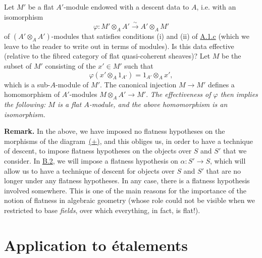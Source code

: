 \documentclass{article}
\newenvironment{rmenv}[1]
  {\phantomsection\par\medskip\noindent\textbf{#1.}\rmfamily}
  {\par\medskip}
\newcommand{\oldpage}[1]{\marginpar{\footnotesize$\Big\vert$ \textit{p.~#1}}}
\begin{document}
Let $M'$ be a flat $A'$-module endowed with a descent data to $A$, i.e. with an isomorphism
\[
  \varphi\colon M'\otimes_A A' \xrightarrow{\sim} A'\otimes_A M'
\]
of $(A'\otimes_A A')$-modules that satisfies conditions (i) and (ii) of \hyperref[A.1.c]{A.1.c} (which we leave to the reader to write out in terms of modules).
Is this data effective (relative to the fibred category of flat quasi-coherent sheaves)?
Let $M$ be the subset of $M'$ consisting of the $x'\in M'$ such that
\[
  \varphi(x'\otimes_A 1_{A'}) = 1_{A'}\otimes_A x',
\]
which is a sub-$A$-module of $M'$.
The canonical injection $M\to M'$ defines a homomorphism of $A'$-modules $M\otimes_A A'\to M'$.
\emph{The effectiveness of $\varphi$ then implies the following: $M$ is a flat $A$-module, and the above homomorphism is an isomorphism.}

\begin{rmenv}{Remark}
  In the above, we have imposed no flatness hypotheses on the morphisms of the diagram~\hyperref[equation-example:A.2.b]{(+)}, and this obliges us, in order to have a technique of descent, to impose flatness hypotheses on the objects over $S$ and $S'$ that we consider.
  In \hyperref[B.2]{B.2}, we will impose a flatness hypothesis on $\alpha\colon S'\to S$, which will allow us to have a technique of descent for objects over $S$ and $S'$ that are no longer under any flatness hypotheses.
  In any case, there is a flatness hypothesis involved somewhere.
  This is one of the main reasons for the importance of the notion of flatness in algebraic geometry (whose role could not be visible when we restricted to base \emph{fields}, over which everything, in fact, is flat!).
\end{rmenv}


\oldpage{190-10}
\section{Application to \'{e}talements}
\label{A.3}
\end{document}
